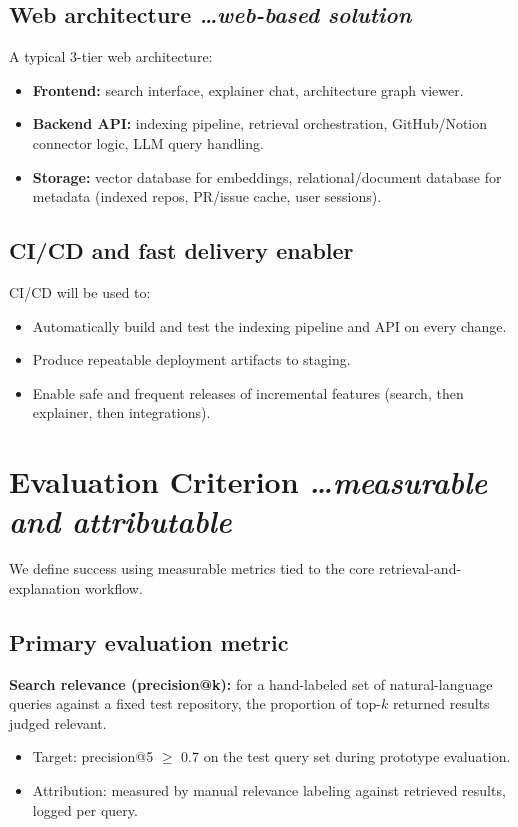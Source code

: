 \documentclass[11pt,a4paper]{article}
\newcommand{\BvrHint}[1]{%
  {\normalfont\normalsize\itshape\hfill #1}}
\begin{document}
\subsection{Web architecture %
\BvrHint{\ldots web-based solution}}
A typical 3-tier web architecture:
\begin{itemize}[leftmargin=0.7cm]
    \item \textbf{Frontend:} search interface, explainer chat, architecture graph viewer.
    \item \textbf{Backend API:} indexing pipeline, retrieval orchestration, GitHub/Notion connector logic, LLM query handling.
    \item \textbf{Storage:} vector database for embeddings, relational/document database for metadata (indexed repos, PR/issue cache, user sessions).
\end{itemize}

\subsection{CI/CD and fast delivery enabler}
CI/CD will be used to:
\begin{itemize}[leftmargin=0.7cm]
    \item Automatically build and test the indexing pipeline and API on every change.
    \item Produce repeatable deployment artifacts to staging.
    \item Enable safe and frequent releases of incremental features (search, then explainer, then integrations).
\end{itemize}

\section{Evaluation Criterion %
\BvrHint{\ldots measurable and attributable}}
We define success using measurable metrics tied to the core retrieval-and-explanation workflow.

\subsection{Primary evaluation metric}
\textbf{Search relevance (precision@k):} for a hand-labeled set of natural-language queries against a fixed test repository, the proportion of top-$k$ returned results judged relevant.
\begin{itemize}[leftmargin=0.7cm]
    \item Target: precision@5 $\ge$ 0.7 on the test query set during prototype evaluation.
    \item Attribution: measured by manual relevance labeling against retrieved results, logged per query.
\end{itemize}
\end{document}
